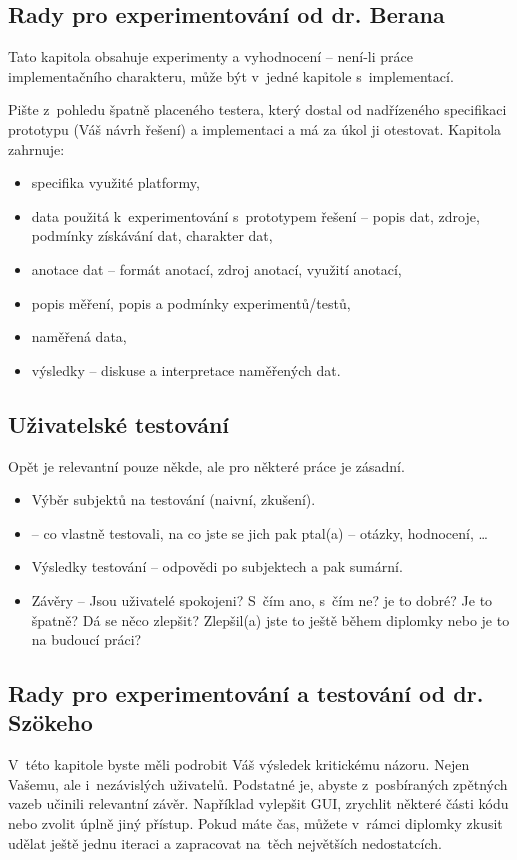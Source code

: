 \subsection*{Rady pro experimentování od dr. Berana}
Tato kapitola obsahuje experimenty a vyhodnocení -- není-li práce implementačního charakteru, může být v~jedné kapitole s~implementací.

Pište z~pohledu špatně placeného testera, který dostal od nadřízeného specifikaci prototypu (Váš návrh řešení) a implementaci a má za úkol ji otestovat. Kapitola zahrnuje:
\begin{itemize}
  \item{specifika využité platformy,}
  \item{data použitá k~experimentování s~prototypem řešení -- popis dat, zdroje, podmínky získávání dat, charakter dat,}
  \item{anotace dat -- formát anotací, zdroj anotací, využití anotací,}
  \item{popis měření, popis a podmínky experimentů/testů,}
  \item{naměřená data,}
  \item{výsledky -- diskuse a interpretace naměřených dat.}
\end{itemize}

\subsection*{Uživatelské testování}

Opět je relevantní pouze někde, ale pro některé práce je zásadní.
\begin{itemize}
  \item{Výběr subjektů na testování (naivní, zkušení).}
  \item{ -- co vlastně testovali, na co jste se jich pak ptal(a) -- otázky, hodnocení, \ldots}
  \item{Výsledky testování -- odpovědi po subjektech a pak sumární.}
  \item{Závěry -- Jsou uživatelé spokojeni? S~čím ano, s~čím ne? je to dobré? Je to špatně? Dá se něco zlepšit? Zlepšil(a) jste to ještě během diplomky nebo je to na budoucí práci?}
\end{itemize}

\subsection*{Rady pro experimentování a testování od dr. Szökeho}
V~této kapitole byste měli podrobit Váš výsledek kritickému názoru. Nejen Vašemu, ale i~nezávislých uživatelů. Podstatné je, abyste z~posbíraných zpětných vazeb učinili relevantní závěr. Například vylepšit GUI, zrychlit některé části kódu nebo zvolit úplně jiný přístup. Pokud máte čas, můžete v~rámci diplomky zkusit udělat ještě jednu iteraci a zapracovat na~těch největších nedostatcích.

